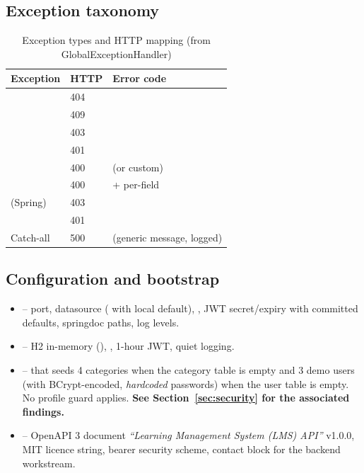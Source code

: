 \subsection{Exception taxonomy}

\begin{table}[H]
\centering
\caption{Exception types and HTTP mapping (from GlobalExceptionHandler)}
\label{tab:exception-taxonomy}
\begin{tabular}{@{}L{4.6cm}C{2.0cm}L{6.4cm}@{}}
\toprule
\textbf{Exception} & \textbf{HTTP} & \textbf{Error code} \\
\midrule
{} & 404 &  \\
 & 409 &  \\
 & 403 &  \\
 & 401 &  \\
 & 400 &  (or custom) \\
 & 400 &  + per-field  \\
 (Spring) & 403 &  \\
 & 401 &  \\
Catch-all  & 500 &  (generic message, logged) \\
\bottomrule
\end{tabular}
\end{table}

\subsection{Configuration and bootstrap}

\begin{itemize}
    \item {} -- port, datasource ( with local default), , JWT secret/expiry with committed defaults, springdoc paths, log levels.
    \item {} -- H2 in-memory (), , 1-hour JWT, quiet logging.
    \item {} --  that seeds 4 categories when the category table is empty and 3 demo users (with BCrypt-encoded, \emph{hardcoded} passwords) when the user table is empty. No profile guard applies. \textbf{See Section~\ref{sec:security} for the associated findings.}
    \item {} -- OpenAPI 3 document \emph{``Learning Management System (LMS) API''} v1.0.0, MIT licence string, bearer security scheme, contact block for the backend workstream.
\end{itemize}

